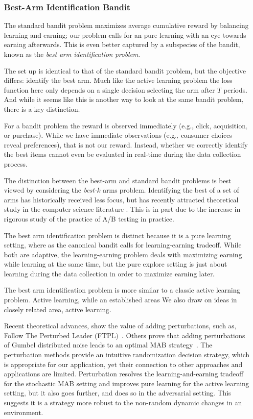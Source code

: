 \documentclass[a4paper,12pt]{article}
\begin{document}
\subsubsection{Best-Arm Identification Bandit}

The standard bandit problem maximizes average cumulative reward by balancing learning and earning; our problem calls for an pure learning with an eye towards earning afterwards. This is even better captured by a subspecies of the bandit, known as the \emph{best arm identification problem}. 

The set up is identical to that of the standard bandit problem, but the objective differs: identify the best arm. Much like the active learning problem the loss function here only depends on a single decision selecting the arm after $T$ periods. And while it seems like this is another way to look at the same bandit problem, there is a key distinction. 

For a bandit problem the reward is observed immediately (e.g., click, acquisition, or purchase). While we have immediate observations (e.g., consumer choices reveal preferences), that is not our reward. Instead, whether we correctly identify the best items cannot even be evaluated in real-time during the data collection process. 

The distinction between the best-arm and standard bandit problems is best viewed by considering the \emph{best-$k$} arms problem. Identifying the best of a set of arms has historically received less focus, but has recently attracted theoretical study in the computer science literature \citep{gabillon2012best,kalyanakrishnan2012pac,kaufmann2016complexity,kaufmann2013information,russo2016simple}. This is in part due to the increase in rigorous study of the practice of A/B testing in practice. 

The best arm identification problem is distinct because it is a pure learning setting, where as the canonical bandit calls for learning-earning tradeoff. While both are adaptive, the learning-earning problem deals with maximizing earning while learning at the same time, but the pure explore setting is just about learning during the data collection in order to maximize earning later. 

The best arm identification problem is more similar to a classic active learning problem. Active learning, while an established areas 
We also draw on ideas in closely related area, active learning. 

Recent theoretical advances, show the value of adding perturbations, such as, Follow The Perturbed Leader (FTPL)~\citep{kalai2005efficient}. Others prove that adding perturbations of Gumbel distributed noise leads to an optimal MAB strategy~\citep{abernethy2015fighting,kujala2005following}. The perturbation methods provide an intuitive randomization decision strategy, which is appropriate for our application, yet their connection to other approaches and applications are limited. Perturbation resolves the learning-and-earning tradeoff for the stochastic MAB setting and improves pure learning for the active learning setting, but it also goes further, and does so in the adversarial setting. This suggests it is a strategy more robust to the non-random dynamic changes in an environment. 
\end{document}
